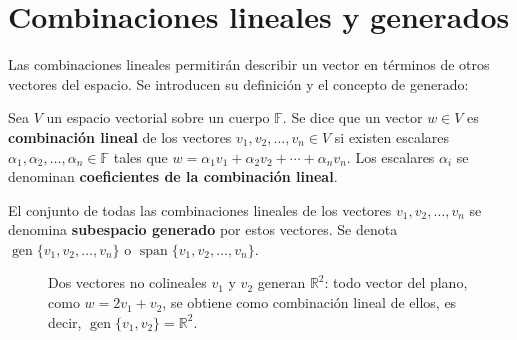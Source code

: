 \section{Combinaciones lineales y generados}
Las combinaciones lineales permitirán describir un vector en términos de otros vectores del espacio. Se introducen su definición y el concepto de generado:

\begin{definition}\label{def:comblineal}
Sea $V$ un espacio vectorial sobre un cuerpo $\mathbb{F}$. Se dice que un vector $w \in V$ es \textbf{combinación lineal} de los vectores $v_1,v_2,\dots, v_n \in V$ si existen escalares $\alpha_1,\alpha_2,\dots,\alpha_n \in \mathbb{F}$ tales que  \(w = \alpha_1 v_1 + \alpha_2 v_2 + \cdots + \alpha_n v_n.\)
Los escalares $\alpha_i$ se denominan \textbf{coeficientes de la combinación lineal}.
\end{definition}

\begin{definition} \label{defgenerado}
El conjunto de todas las combinaciones lineales de los vectores $v_1,v_2,\dots, v_n$ se denomina \textbf{subespacio generado} por estos vectores. Se denota $\operatorname{gen}\{v_1,v_2,\dots, v_n\}$ o $\operatorname{span}\{v_1,v_2,\dots, v_n\}$.
\end{definition}

\begin{figure}[!htbp]
\centering
{}
\caption{Dos vectores no colineales $v_1$ y $v_2$ generan $\mathbb{R}^2$: todo vector del plano, como $w=2v_1+v_2$, se obtiene como combinación lineal de ellos, es decir, $\operatorname{gen}\{v_1,v_2\}=\mathbb{R}^2$.}
\label{fig:gen_dos_vectores}
\end{figure}

